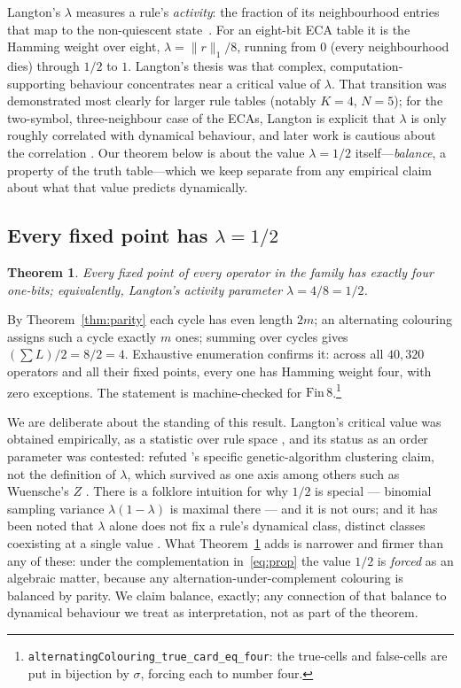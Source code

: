 \documentclass[man,12pt,floatsintext]{apa7}
\newcommand{\sig}{\sigma}
\newtheorem{theorem}{Theorem}
\begin{document}
Langton's $\lambda$ measures a rule's \emph{activity}: the fraction of its
neighbourhood entries that map to the non-quiescent
state~\parencite{langton1990computation}. For an eight-bit ECA table it is
the Hamming weight over eight, $\lambda = \lVert r \rVert_1 / 8$, running
from $0$ (every neighbourhood dies) through $1/2$ to $1$. Langton's thesis
was that complex, computation-supporting behaviour concentrates near a
critical value of $\lambda$. That transition was demonstrated most clearly
for larger rule tables (notably $K=4$, $N=5$); for the two-symbol,
three-neighbour case of the ECAs, Langton is explicit that $\lambda$ is only
roughly correlated with dynamical behaviour, and later work is cautious about
the correlation \parencite{mitchell1993revisiting}. Our theorem below is
about the value $\lambda = 1/2$ itself---\emph{balance}, a property of the
truth table---which we keep separate from any empirical claim about what that
value predicts dynamically.

\subsection{Every fixed point has $\lambda = 1/2$}

\begin{theorem}\label{thm:lambda}
Every fixed point of every operator in the family has exactly four one-bits;
equivalently, Langton's activity parameter $\lambda = 4/8 = 1/2$.
\end{theorem}

\noindent By Theorem~\ref{thm:parity} each cycle has even length $2m$; an
alternating colouring assigns such a cycle exactly $m$ ones; summing over
cycles gives $(\sum L)/2 = 8/2 = 4$. Exhaustive enumeration confirms it:
across all $40{,}320$ operators and all their fixed points, every one has
Hamming weight four, with zero exceptions. The statement is machine-checked
for $\mathrm{Fin}\,8$.\footnote{%
\texttt{alternatingColouring\_true\_card\_eq\_four}: the true-cells and
false-cells are put in bijection by $\sig$, forcing each to number four.}

We are deliberate about the standing of this result. Langton's critical
value was obtained empirically, as a statistic over rule space
\parencite{langton1990computation}, and its status as an order parameter
was contested: \textcite{mitchell1993revisiting} refuted
\textcite{packard1988adaptation}'s specific genetic-algorithm clustering
claim, not the definition of $\lambda$, which survived as one axis among
others such as Wuensche's $Z$ \parencite{wuensche1999classifying}. There is
a folklore intuition for why $1/2$ is special --- binomial sampling variance
$\lambda(1-\lambda)$ is maximal there --- and it is not ours; and it has been
noted that $\lambda$ alone does not fix a rule's dynamical class, distinct
classes coexisting at a single value \parencite{sakai2002edge}. What
Theorem~\ref{thm:lambda} adds is narrower and firmer than any of these: under
the complementation in~\eqref{eq:prop} the value $1/2$ is \emph{forced} as an
algebraic matter, because any alternation-under-complement colouring is
balanced by parity. We claim balance, exactly; any connection of that
balance to dynamical behaviour we treat as interpretation, not as part of the
theorem.
\end{document}
